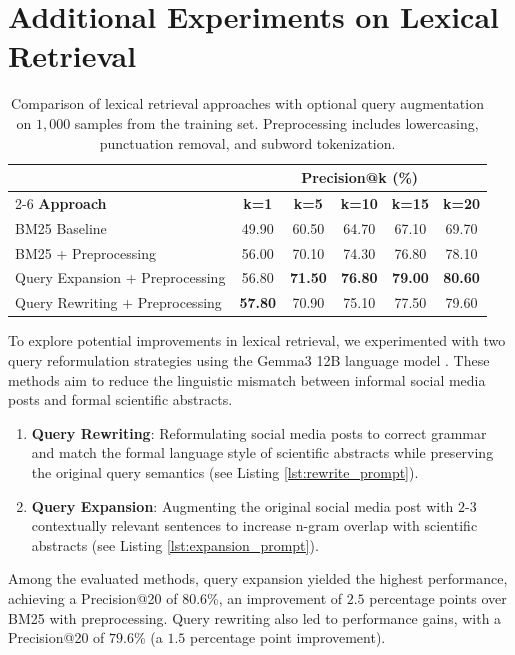 %
%
\section{Additional Experiments on Lexical Retrieval} \label{sec:lexical_exp}

\begin{table}[h]
\centering
\caption{Comparison of lexical retrieval approaches with optional query augmentation on $1,000$ samples from the training set. Preprocessing includes lowercasing, punctuation removal, and subword tokenization.}
\label{tab:preprocessing-comparison}
\begin{tabular}{lccccc}
\toprule
 & \multicolumn{5}{c}{\textbf{Precision@k (\%)}} \\
 \cmidrule(lr){2-6}
\textbf{Approach} & \textbf{k=1} & \textbf{k=5} & \textbf{k=10} & \textbf{k=15} & \textbf{k=20} \\
\midrule
BM25 Baseline & 49.90 & 60.50 & 64.70 & 67.10 & 69.70 \\
BM25 + Preprocessing & 56.00 & 70.10 & 74.30 & 76.80 & 78.10 \\
Query Expansion + Preprocessing & 56.80 & \textbf{71.50} & \textbf{76.80} & \textbf{79.00} & \textbf{80.60} \\
Query Rewriting + Preprocessing & \textbf{57.80} & 70.90 & 75.10 & 77.50 & 79.60 \\
\bottomrule
\end{tabular}
\vspace{0.1cm}
\end{table}

To explore potential improvements in lexical retrieval, we experimented with two query reformulation strategies using the Gemma3 12B language model \cite{gemmateam2025gemma3technicalreport}. These methods aim to reduce the linguistic mismatch between informal social media posts and formal scientific abstracts.
%
\begin{enumerate}
\item \textbf{Query Rewriting}: Reformulating social media posts to correct grammar and match the formal language style of scientific abstracts while preserving the original query semantics (see Listing \ref{lst:rewrite_prompt}).
\item \textbf{Query Expansion}: Augmenting the original social media post with $2$-$3$ contextually relevant sentences to increase n-gram overlap with scientific abstracts (see Listing \ref{lst:expansion_prompt}).
\end{enumerate}
%
Among the evaluated methods, query expansion yielded the highest performance, achieving a Precision@20 of $80.6$\%, an improvement of $2.5$ percentage points over BM25 with preprocessing. Query rewriting also led to performance gains, with a Precision@20 of $79.6$\% (a $1.5$ percentage point improvement). 

